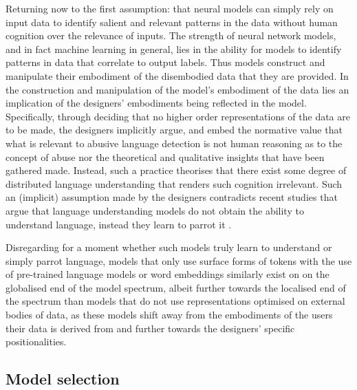 Returning now to the first assumption: that neural models can simply rely on input data to identify salient and relevant patterns in the data without human cognition over the relevance of inputs. The strength of neural network models, and in fact machine learning in general, lies in the ability for models to identify patterns in data that correlate to output labels. Thus models construct and manipulate their embodiment of the disembodied data that they are provided. In the construction and manipulation of the model's embodiment of the data lies an implication of the designers' embodiments being reflected in the model. Specifically, through deciding that no higher order representations of the data are to be made, the designers implicitly argue, and embed the normative value that what is relevant to abusive language detection is not human reasoning as to the concept of abuse nor the theoretical and qualitative insights that have been gathered made. Instead, such a practice theorises that there exist some degree of distributed language understanding that renders such cognition irrelevant. Such an (implicit) assumption made by the designers contradicts recent studies that argue that language understanding models do not obtain the ability to understand language, instead they learn to parrot it \citep{Bender-Koller:2020}.

Disregarding for a moment whether such models truly learn to understand or simply parrot language, models that only use surface forms of tokens with the use of pre-trained language models or word embeddings similarly exist on on the globalised end of the model spectrum, albeit further towards the localised end of the spectrum than models that do not use representations optimised on external bodies of data, as these models shift away from the embodiments of the users their data is derived from and further towards the designers' specific positionalities.

\subsection{Model selection}

